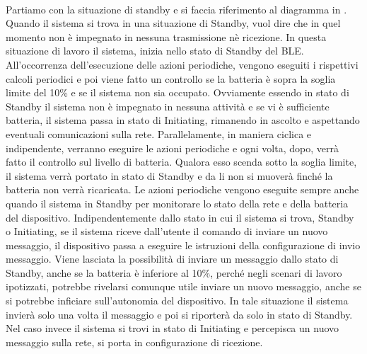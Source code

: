 \\
Partiamo con la situazione di standby e si faccia riferimento al diagramma in . Quando il sistema si trova in una situazione di Standby, vuol dire che in quel momento non è impegnato in nessuna trasmissione nè ricezione. In questa situazione di lavoro il sistema, inizia nello stato di Standby del \acs{BLE}. All'occorrenza dell'esecuzione delle azioni periodiche, vengono eseguiti i rispettivi calcoli periodici e poi viene fatto un controllo se la batteria è sopra la soglia limite del 10\% e se il sistema non sia occupato. Ovviamente essendo in stato di Standby il sistema non è impegnato in nessuna attività e se vi è sufficiente batteria, il sistema passa in stato di Initiating, rimanendo in ascolto e aspettando eventuali comunicazioni sulla rete. Parallelamente, in maniera ciclica e indipendente, verranno eseguire le azioni periodiche e ogni volta, dopo, verrà fatto il controllo sul livello di batteria. Qualora esso scenda sotto la soglia limite, il sistema verrà portato in stato di Standby e da li non si muoverà finché la batteria non verrà ricaricata. Le azioni periodiche vengono eseguite sempre anche quando il sistema in Standby per monitorare lo stato della rete e della batteria del dispositivo.
Indipendentemente dallo stato in cui il sistema si trova, Standby o Initiating, se il sistema riceve dall'utente il comando di inviare un nuovo messaggio, il dispositivo passa a eseguire le istruzioni della configurazione di invio messaggio. Viene lasciata la possibilità di inviare un messaggio dallo stato di Standby, anche se la batteria è inferiore al 10\%, perché negli scenari di lavoro ipotizzati, potrebbe rivelarsi comunque utile inviare un nuovo messaggio, anche se si potrebbe inficiare sull'autonomia del dispositivo. In tale situazione il sistema invierà solo una volta il messaggio e poi si riporterà da solo in stato di Standby. Nel caso invece il sistema si trovi in stato di Initiating e percepisca un nuovo messaggio sulla rete, si porta in configurazione di ricezione.
\bigskip

